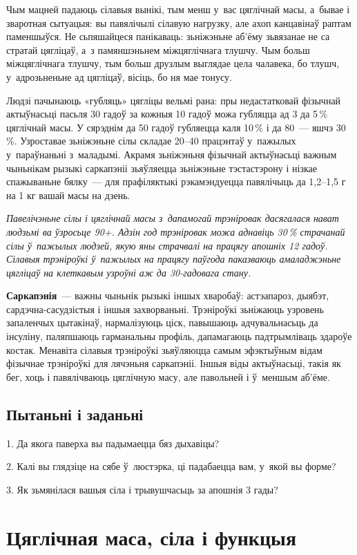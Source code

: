 Чым мацней падаюць сілавыя вынікі, тым менш у~вас цяглічнай масы, а~бывае і зваротная сытуацыя: вы павялічылі сілавую нагрузку, але ахоп канцавінаў раптам паменшыўся. Не сьпяшайцеся панікаваць: зьніжэньне аб'ёму зьвязанае не са стратай цягліцаў, а~з памяншэньнем міжцяглічнага тлушчу. Чым больш міжцяглічнага тлушчу, тым больш друзлым выглядае цела чалавека, бо тлушч, у~адрозьненьне ад цягліцаў, вісіць, бо ня мае тонусу.

Людзі пачынаюць «губляць» цягліцы вельмі рана: пры недастатковай фізычнай актыўнасьці пасьля 30 гадоў за кожныя 10 гадоў можа губляцца ад 3 да 5\,\% цяглічнай масы. У сярэднім да 50 гадоў губляецца каля 10\,\% і да 80~--- яшчэ 30\,\%. Узроставае зьніжэньне сілы складае 20--40 працэнтаў у~пажылых у~параўнаньні з~маладымі. Акрамя зьніжэньня фізычнай актыўнасьці важным чыньнікам рызыкі саркапэніі зьяўляецца зьніжэньне тэстастэрону і нізкае спажываньне бялку~--- для прафіляктыкі рэкамэндуецца павялічыць да 1,2--1,5 г на 1 кг вашай масы на дзень.

\emph{Павелічэньне сілы і цяглічнай масы з~дапамогай трэніровак дасягалася нават людзьмі ва ўзросьце 90+. Адзін год трэніровак можа аднавіць 30\,\% страчанай сілы ў~пажылых людзей, якую яны страчвалі на працягу апошніх 12 гадоў. Сілавыя трэніроўкі ў~пажылых на працягу паўгода паказваюць амаладжэньне цягліцаў на клеткавым узроўні аж да 30-гадовага стану.}

\textbf{Саркапэнія}~--- важны чыньнік рызыкі іншых хваробаў: астэапароз, дыябэт, сардэчна-сасудзістыя і іншыя захворваньні. Трэніроўкі зьніжаюць узровень запаленчых цытакінаў, нармалізуюць ціск, павышаюць адчувальнасьць да інсуліну, паляпшаюць гарманальны профіль, дапамагаюць падтрымліваць здароўе костак. Менавіта сілавыя трэніроўкі зьяўляюцца самым эфэктыўным відам фізычнае трэніроўкі для лячэньня саркапэніі. Іншыя віды актыўнасьці, такія як бег, хоць і павялічваюць цяглічную масу, але павольней і ў~меншым аб'ёме.

\subsection*{Пытаньні і заданьні}

1. Да якога паверха вы падымаецца бяз дыхавіцы?

2. Калі вы глядзіце на сябе ў~люстэрка, ці падабаецца вам, у~якой вы форме?

3. Як зьмянілася вашыя сіла і трывушчасьць за апошнія 3 гады?


\section{Цяглічная маса, сіла і функцыя}


